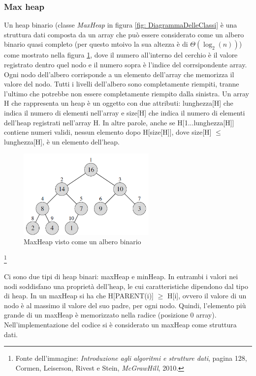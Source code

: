 \documentclass{article}
\begin{document}
\subsubsection{Max heap}
Un heap binario (classe \textit{MaxHeap} in figura \ref{fig: DiagrammaDelleClassi} è una struttura dati composta da un array che può essere considerato come un albero binario quasi completo (per questo mtoivo la sua altezza è di $\Theta(\log_2(n))$) come mostrato nella figura \ref{fig: Heap1}, dove il numero all'interno del cerchio è il valore registrato dentro quel nodo e il numero sopra è l'indice del corrsipondente array. Ogni nodo dell'albero corrisponde a un elemento dell'array che memorizza il valore del nodo. Tutti i livelli dell'albero sono completamente riempiti, tranne l'ultimo che potrebbe non essere completamente riempito dalla sinistra. Un array H che rappresenta un heap è un oggetto con due attributi: lunghezza[H] che indica il numero di elementi nell'array e size[H] che indica il numero di elementi dell'heap registrati nell'array H. In altre parole, anche se H[1...lunghezza[H]] contiene numeri validi, nessun elemento dopo H[size[H]], dove size[H] \(\leq\) lunghezza[H], è un elemento dell'heap.

\begin{figure}[H]
    \includegraphics[width=0.6\textwidth]{Images/Heap1.png}
    \centering
    \caption{MaxHeap visto come un albero binario}
    \label{fig: Heap1}
\end{figure}

\footnote{Fonte dell'immagine: \textit{Introduzione agli algoritmi e strutture dati}, pagina 128, Cormen, Leiserson, Rivest e Stein, \emph{McGrawHill}, 2010.}

Ci sono due tipi di heap binari: maxHeap e minHeap. In entrambi i valori nei nodi soddisfano una proprietà dell'heap, le cui caratteristiche dipendono dal tipo di heap. In un maxHeap si ha che H[PARENT(i)] \(\geq\) H[i], ovvero il valore di un nodo è al massimo il valore del suo padre, per ogni nodo. Quindi, l'elemento più grande di un maxHeap è memorizzato nella radice (posizione 0 array). Nell'implementazione del codice si è considerato un maxHeap come struttura dati.
\end{document}
